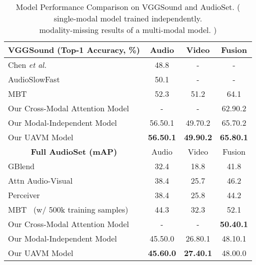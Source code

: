 \documentclass[journal]{IEEEtran}
\begin{document}
\begin{table}[t]
\scriptsize
\centering
\caption{Model Performance Comparison on VGGSound and AudioSet. ( single-modal model trained independently. \\ modality-missing results of a multi-modal model. )}
\vspace{-1.0em}
\label{tab:main_res}
\begin{tabular}{@{}lccc@{}}
\toprule
\multicolumn{1}{c}{\textbf{VGGSound (Top-1 Accuracy, \%)}}        & Audio & Video & Fusion \\ \midrule
Chen \emph{et al.}~\cite{chen2020vggsound}& 48.8                      & -                         & -         \\
AudioSlowFast~\cite{kazakos2021slow}& 50.1                      & -                         & -               \\
MBT~\cite{nagrani2021attention}     & 52.3   & 51.2             & 64.1                       \\ \midrule
Our Cross-Modal Attention Model & -                         & -                         & 62.90.2         \\
Our Modal-Independent Model & 56.50.1              & 49.70.2              & 65.70.2             \\
Our UAVM Model         & \textbf{56.50.1}   & \textbf{49.90.2}              & \textbf{65.80.1}    \\ \midrule\midrule
\multicolumn{1}{c}{\textbf{Full AudioSet (mAP)}} & Audio & Video & Fusion \\ \midrule
GBlend~\cite{wang2020makes} & 32.4                     & 18.8                     & 41.8                     \\
Attn Audio-Visual~\cite{fayek2021large} & 38.4         & 25.7                     & 46.2                     \\
Perceiver~\cite{jaegle2021perceiver} & 38.4                     & 25.8                     & 44.2            \\
MBT~\cite{nagrani2021attention} (w/ 500k training samples) & 44.3                     & 32.3                      & 52.1                       \\ \midrule
Our Cross-Modal Attention Model & -                     & -                         & \textbf{50.40.1} \\
Our Modal-Independent Model     & 45.50.0          & 26.80.1              & 48.10.1        \\
Our UAVM Model                    & \textbf{45.60.0} & \textbf{27.40.1}     & 48.00.0        \\ \bottomrule
\end{tabular}
\vspace{-2.5em}
\end{table}
\end{document}
